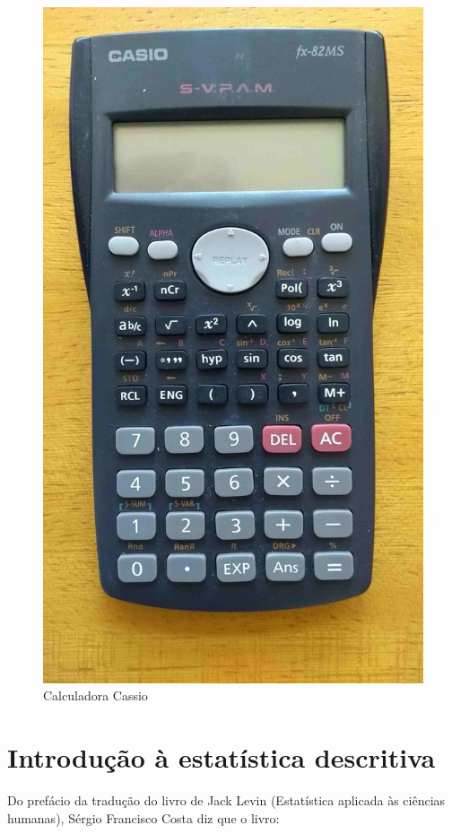 \documentclass[
]{book}
\begin{document}
\begin{figure}

{\centering \includegraphics[width=0.8\linewidth]{images2/calculadora_cassio} 

}

\caption{Calculadora Cassio}\label{fig:unnamed-chunk-10}
\end{figure}

\hypertarget{introduuxe7uxe3o-uxe0-estatuxedstica-descritiva}{%
\chapter{Introdução à estatística descritiva}\label{introduuxe7uxe3o-uxe0-estatuxedstica-descritiva}}

Do prefácio da tradução do livro de Jack Levin (Estatística aplicada às ciências humanas), Sérgio Francisco Costa diz que o livro:
\end{document}
